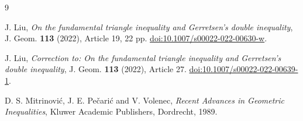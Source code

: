 \documentclass[11pt]{amsart}
\theoremstyle{remark}
\begin{document}
\begin{thebibliography}{9}

J. Liu,
\emph{On the fundamental triangle inequality and Gerretsen's double inequality},
J. Geom. \textbf{113} (2022), Article 19, 22 pp.
\href{https://doi.org/10.1007/s00022-022-00630-w}{doi:10.1007/s00022-022-00630-w}.

J. Liu,
\emph{Correction to: On the fundamental triangle inequality and Gerretsen's double inequality},
J. Geom. \textbf{113} (2022), Article 27.
\href{https://doi.org/10.1007/s00022-022-00639-1}{doi:10.1007/s00022-022-00639-1}.

D. S. Mitrinovi\'c, J. E. Pe\v{c}ari\'c and V. Volenec,
\emph{Recent Advances in Geometric Inequalities},
Kluwer Academic Publishers, Dordrecht, 1989.

\end{thebibliography}
\end{document}
